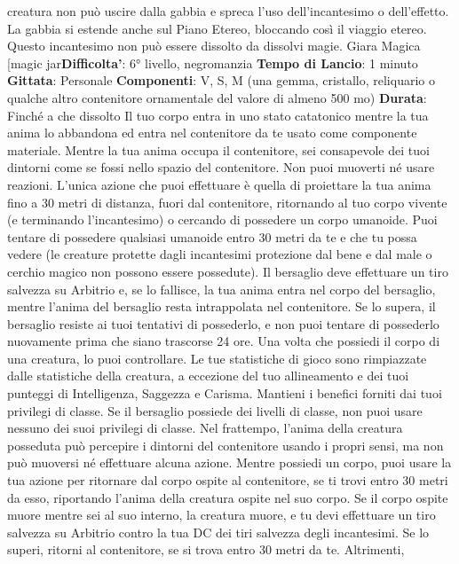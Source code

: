 \begin{multicols}{2}
creatura non può uscire dalla gabbia e spreca l’uso
dell’incantesimo o dell’effetto. La gabbia si estende
anche sul Piano Etereo, bloccando così il viaggio
etereo.
Questo incantesimo non può essere dissolto da dissolvi
magie.
Giara Magica
[magic jar\textbf{Difficolta'}:
6° livello, negromanzia
\textbf{Tempo di Lancio}: 1 minuto
\textbf{Gittata}: Personale
\textbf{Componenti}: V, S, M (una gemma, cristallo, reliquario
o qualche altro contenitore ornamentale del valore di
almeno 500 mo)
\textbf{Durata}: Finché a che dissolto
Il tuo corpo entra in uno stato catatonico mentre la tua
anima lo abbandona ed entra nel contenitore da te
usato come componente materiale. Mentre la tua anima
occupa il contenitore, sei consapevole dei tuoi dintorni
come se fossi nello spazio del contenitore. Non puoi
muoverti né usare reazioni. L’unica azione che puoi
effettuare è quella di proiettare la tua anima fino a 30
metri di distanza, fuori dal contenitore, ritornando al tuo
corpo vivente (e terminando l’incantesimo) o cercando
di possedere un corpo umanoide.
Puoi tentare di possedere qualsiasi umanoide entro 30
metri da te e che tu possa vedere (le creature protette
dagli incantesimi protezione dal bene e dal male o
cerchio magico non possono essere possedute). Il
bersaglio deve effettuare un tiro salvezza su Arbitrio e,
se lo fallisce, la tua anima entra nel corpo del bersaglio,
mentre l’anima del bersaglio resta intrappolata nel
contenitore. Se lo supera, il bersaglio resiste ai tuoi
tentativi di possederlo, e non puoi tentare di possederlo
nuovamente prima che siano trascorse 24 ore.
Una volta che possiedi il corpo di una creatura, lo puoi
controllare. Le tue statistiche di gioco sono rimpiazzate
dalle statistiche della creatura, a eccezione del tuo
allineamento e dei tuoi punteggi di Intelligenza,
Saggezza e Carisma. Mantieni i benefici forniti dai tuoi
privilegi di classe. Se il bersaglio possiede dei livelli di
classe, non puoi usare nessuno dei suoi privilegi di
classe.
Nel frattempo, l’anima della creatura posseduta può
percepire i dintorni del contenitore usando i propri
sensi, ma non può muoversi né effettuare alcuna
azione.
Mentre possiedi un corpo, puoi usare la tua azione per
ritornare dal corpo ospite al contenitore, se ti trovi entro
30 metri da esso, riportando l’anima della creatura
ospite nel suo corpo. Se il corpo ospite muore mentre
sei al suo interno, la creatura muore, e tu devi effettuare
un tiro salvezza su Arbitrio contro la tua DC dei tiri
salvezza degli incantesimi. Se lo superi, ritorni al
contenitore, se si trova entro 30 metri da te. Altrimenti,

\end{multicols}
